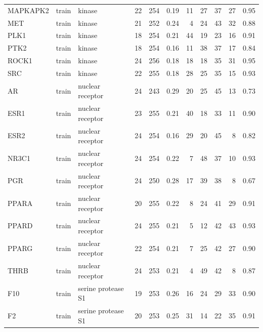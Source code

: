 \begin{longtable}{llp{2.4cm}rrrrrrrr}
MAPKAPK2 & train & kinase & 22 & 254 & 0.19 & 11 & 27 & 37 & 27 & 0.95 \\
MET & train & kinase & 21 & 252 & 0.24 & 4 & 24 & 43 & 32 & 0.88 \\
PLK1 & train & kinase & 18 & 254 & 0.21 & 44 & 19 & 23 & 16 & 0.91 \\
PTK2 & train & kinase & 18 & 254 & 0.16 & 11 & 38 & 37 & 17 & 0.84 \\
ROCK1 & train & kinase & 24 & 256 & 0.18 & 18 & 18 & 35 & 31 & 0.95 \\
SRC & train & kinase & 22 & 255 & 0.18 & 28 & 25 & 35 & 15 & 0.93 \\
AR & train & nuclear receptor & 24 & 243 & 0.29 & 20 & 25 & 45 & 13 & 0.73 \\
ESR1 & train & nuclear receptor & 23 & 255 & 0.21 & 40 & 18 & 33 & 11 & 0.90 \\
ESR2 & train & nuclear receptor & 24 & 254 & 0.16 & 29 & 20 & 45 & 8 & 0.82 \\
NR3C1 & train & nuclear receptor & 24 & 254 & 0.22 & 7 & 48 & 37 & 10 & 0.93 \\
PGR & train & nuclear receptor & 24 & 250 & 0.28 & 17 & 39 & 38 & 8 & 0.67 \\
PPARA & train & nuclear receptor & 20 & 255 & 0.22 & 8 & 24 & 41 & 29 & 0.91 \\
PPARD & train & nuclear receptor & 24 & 255 & 0.21 & 5 & 12 & 42 & 43 & 0.93 \\
PPARG & train & nuclear receptor & 22 & 254 & 0.21 & 7 & 25 & 42 & 27 & 0.90 \\
THRB & train & nuclear receptor & 24 & 253 & 0.21 & 4 & 49 & 42 & 8 & 0.87 \\
F10 & train & serine protease S1 & 19 & 253 & 0.26 & 16 & 24 & 29 & 33 & 0.90 \\
F2 & train & serine protease S1 & 20 & 253 & 0.25 & 31 & 14 & 22 & 35 & 0.91 \\
\bottomrule
\end{longtable}
